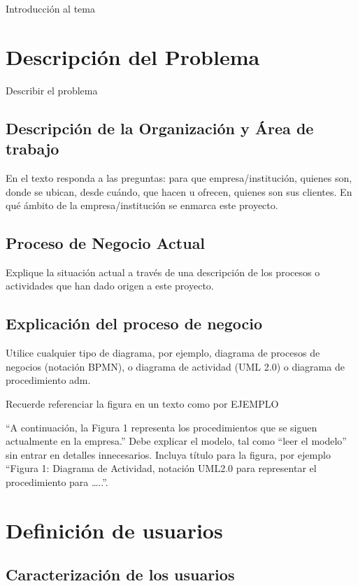 Introducción al tema




\section{Descripción del Problema}

Describir el problema


\subsection{Descripción de la Organización y Área de trabajo}

En el texto responda a las preguntas: para que empresa/institución, quienes son, donde se ubican, desde cuándo, que hacen u ofrecen, quienes son sus clientes. 
En qué ámbito de la empresa/institución se enmarca este proyecto.

\subsection{Proceso de Negocio Actual}

Explique la situación actual a través de una descripción de los procesos o actividades que han dado origen a este proyecto. 

\subsection{Explicación del proceso de negocio}

Utilice cualquier tipo de diagrama, por ejemplo, 
diagrama de procesos de negocios (notación BPMN), o 
diagrama de actividad (UML 2.0) o 
diagrama de procedimiento adm.
 
Recuerde referenciar la figura en un texto como por EJEMPLO 

“A continuación, la Figura 1 representa los procedimientos que se siguen actualmente en la empresa.” Debe explicar el modelo, tal como “leer el modelo” sin entrar en detalles innecesarios. 
Incluya título para la figura, por ejemplo “Figura 1: Diagrama de Actividad, notación UML2.0 para representar el procedimiento para …..”.

\section{Definición de usuarios}
\subsection{Caracterización de los usuarios}
